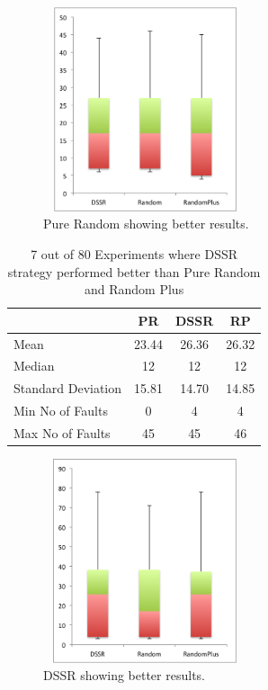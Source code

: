 \documentclass[conference]{IEEEtran}
\begin{document}
\begin{figure}[ht]
\centering
\includegraphics[width=6cm,height=6cm]{RandomBetter.png}
\caption{Pure Random showing better results.}
\label{fig:Result1}
\end{figure}



\begin{table}[H]
\caption{7 out of 80 Experiments where DSSR strategy performed better than Pure Random and Random Plus}
\centering
\begin{tabular}{|l|c|c|c|}
\hline\hline
 				& PR			&  DSSR 			& RP \\[1ex]
\hline
Mean  			&    23.44		&  26.36			&  26.32\\
Median 			&    12 		&  12 			&  12 \\
Standard Deviation 	&    15.81		&  14.70			&  14.85\\
Min No of Faults	&    0			&  4				&  4\\
Max No of Faults 	&    45		&  45				&  46\\
\hline
\end{tabular}
\label{table:result2}
\end{table}


\begin{figure}[ht]
\centering
\includegraphics[width=6cm,height=6cm]{DSSRBetter.png}
\caption{DSSR showing better results.}
\label{fig:Result1}
\end{figure}
\end{document}
